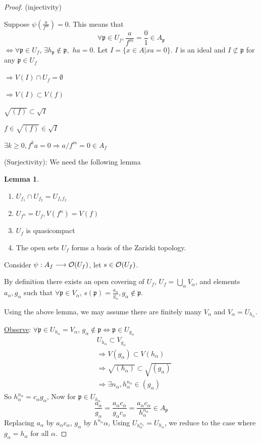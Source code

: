 \documentclass[11pt]{article}
\theoremstyle{definition}
\newtheorem{lemma}[thm]{Lemma}
\newcommand{\scp}{{\mathfrak p}}
\newcommand{\calo}{{\cal O}}
\newcommand{\notsubset}{\not \subset}
\newcommand{\Lrta}{\Longrightarrow}
\newcommand{\lrta}{\longrightarrow}
\newcommand{\Llrta}{\Longleftrightarrow}
\begin{document}
\begin{proof}
(injectivity)

Suppose $\psi\left(\frac{a}{f^m}\right)=0$. This means that 
$$
\forall \scp\in U_f, \frac{a}{f^m}=\frac{0}{1}\in A_\scp
$$
$\Llrta \forall \scp\in U_f$, $\exists h_\scp\notin \scp,$ $ha=0$. Let $I=\{x\in A|xa=0\}$. $I$ is an ideal and $I\notsubset \scp$ for any $\scp \in U_f$

$\Lrta V(I)\cap U_f=\emptyset$

$\Lrta V(I)\subset V(f)$

$\sqrt{(f)}\subset \sqrt{I}$

$f\in \sqrt{(f)}\in\sqrt{I}$

$\exists k\geq 0, f^ka=0\Lrta a/f^m=0\in A_f$

(Surjectivity): We need the following lemma
\begin{lemma}\ 
\begin{enumerate}[label=(\arabic*)]
\item $U_{f_1}\cap U_{f_2}=U_{f_1f_2}$
\item $U_{f^n}=U_{f}, V(f^n)=V(f)$
\item $U_f$ is quasicompact
\item The open sets $U_f$ forms a basis of the Zariski topology.
\end{enumerate}
\end{lemma}
Consider $\psi:A_f\lrta \calo(U_f)$, let $s\in \calo(U_f)$.

By definition there exists an open covering of $U_f$, $U_f=\bigcup_\alpha V_\alpha$, and elements $a_\alpha, g_\alpha$ such that $\forall \scp\in V_\alpha$, $s(\scp)=\frac{a_\alpha}{g_\alpha}, g_\alpha\notin \scp$.

Using the above lemma,  we may assume  there are finitely many $V_\alpha$ and $V_\alpha=U_{h_\alpha}$.

\underline{Observe}: $\forall \scp\in U_{h_\alpha}=V_\alpha$, $g_\alpha\notin\scp\Llrta \scp\in U_{g_\alpha}$
$$
\begin{aligned}
&U_{h_\alpha}\subset V_{g_\alpha}\\
& \Lrta V(g_\alpha)\subset V(h_\alpha)\\
&\Lrta \sqrt{(h_\alpha)}\subset \sqrt{(g_\alpha)}\\
&\Lrta \exists n_\alpha, h^{n_\alpha}_{\alpha}\in (g_{\alpha})
\end{aligned}
$$
So $h^{n_\alpha}_\alpha=c_\alpha g_\alpha$, Now for $\scp\in U_{h_\alpha}$
$$
\frac{a_\alpha}{g_\alpha}=\frac{a_\alpha c_\alpha }{g_\alpha c_\alpha}=\frac{a_\alpha c_\alpha}{h_\alpha^{n_\alpha}}\in A_\scp
$$
Replacing $a_\alpha$ by $a_\alpha c_\alpha$, $g_\alpha$ by $h^{n_\alpha}{\alpha}$, Using $U_{h_\alpha^{n_\alpha}}=U_{h_\alpha}$, we reduce to the case where $g_\alpha=h_\alpha$ for all $\alpha$.


\end{proof}
\end{document}
